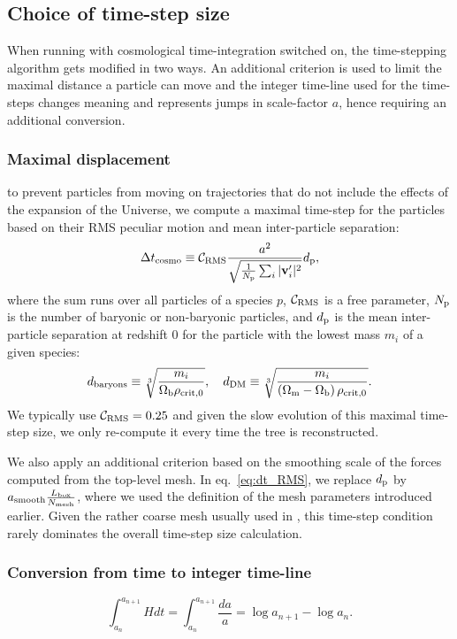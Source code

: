 \subsection{Choice of time-step size}
\label{ssec:timesteps}

When running \swift with cosmological time-integration switched on, the
time-stepping algorithm gets modified in two ways. An additional criterion is
used to limit the maximal distance a particle can move and the integer time-line
used for the time-steps changes meaning and represents jumps in scale-factor $a$, 
hence requiring an additional conversion.

\subsubsection{Maximal displacement}

to prevent particles from moving on trajectories that do not include
the effects of the expansion of the Universe, we compute a maximal
time-step for the particles based on their RMS peculiar motion and
mean inter-particle separation:
\begin{equation}
  \Delta t_{\rm cosmo} \equiv \mathcal{C}_{\rm RMS} \frac{a^2}{\sqrt{\frac{1}{N_{\rm p}}\sum_i | \mathbf{v}_i' |^2}} d_{\rm p},
  \label{eq:dt_RMS}
\end{equation}
where the sum runs over all particles of a species $p$,
$\mathcal{C}_{\rm RMS}$ is a free parameter, $N_{\rm p}$ is the number
of baryonic or non-baryonic particles, and $d_{\rm p}$ is the mean
inter-particle separation at redshift $0$ for the particle with the
lowest mass $m_i$ of a given species:
\begin{equation}
  d_{\rm baryons} \equiv \sqrt[3]{\frac{m_i}{\Omega_{\rm b} \rho_{\rm crit, 0}}}, \quad d_{\rm DM} \equiv \sqrt[3]{\frac{m_i}{\left(\Omega_{\rm m} - \Omega_{\rm b}\right) \rho_{\rm crit, 0}}}.
  \nonumber
\end{equation}
We typically use $\mathcal{C}_{\rm RMS} = 0.25$ and given the slow
evolution of this maximal time-step size, we only re-compute it every
time the tree is reconstructed.

We also apply an additional criterion based on the smoothing scale of
the forces computed from the top-level mesh.  In eq.~\ref{eq:dt_RMS},
we replace $d_{\rm p}$ by
$a_{\rm smooth} \frac{L_{\rm box}}{N_{\rm mesh}}$, where we used the
definition of the mesh parameters introduced earlier. Given the rather
coarse mesh usually used in \swift, this time-step condition rarely
dominates the overall time-step size calculation.

\subsubsection{Conversion from time to integer time-line} 

\begin{equation}
  \int_{a_n}^{a_{n+1}} H dt = \int_{a_n}^{a_{n+1}} \frac{da}{a} =
  \log{a_{n+1}} - \log{a_n}.
\end{equation}
